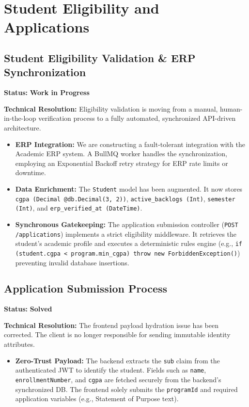 \documentclass[12pt, a4paper]{article}
\begin{document}
\section{Student Eligibility and Applications}

\subsection{Student Eligibility Validation \& ERP Synchronization}
\textbf{Status:} \textcolor{wip}{\textbf{Work in Progress}}

\textbf{Technical Resolution:}
Eligibility validation is moving from a manual, human-in-the-loop verification process to a fully automated, synchronized API-driven architecture.
\begin{itemize}
    \item \textbf{ERP Integration:} We are constructing a fault-tolerant integration with the Academic ERP system. A BullMQ worker handles the synchronization, employing an Exponential Backoff retry strategy for ERP rate limits or downtime.
    \item \textbf{Data Enrichment:} The \texttt{Student} model has been augmented. It now stores \texttt{cgpa (Decimal @db.Decimal(3, 2))}, \texttt{active\_backlogs (Int)}, \texttt{semester (Int)}, and \texttt{erp\_verified\_at (DateTime)}.
    \item \textbf{Synchronous Gatekeeping:} The application submission controller (\texttt{POST /applications}) implements a strict eligibility middleware. It retrieves the student's academic profile and executes a deterministic rules engine (e.g., \texttt{if (student.cgpa < program.min\_cgpa) throw new ForbiddenException()}) preventing invalid database insertions.
\end{itemize}

\subsection{Application Submission Process}
\textbf{Status:} \textcolor{solved}{\textbf{Solved}}

\textbf{Technical Resolution:}
The frontend payload hydration issue has been corrected. The client is no longer responsible for sending immutable identity attributes.
\begin{itemize}
    \item \textbf{Zero-Trust Payload:} The backend extracts the \texttt{sub} claim from the authenticated JWT to identify the student. Fields such as \texttt{name}, \texttt{enrollmentNumber}, and \texttt{cgpa} are fetched securely from the backend's synchronized DB. The frontend solely submits the \texttt{programId} and required application variables (e.g., Statement of Purpose text).
\end{itemize}
\end{document}
